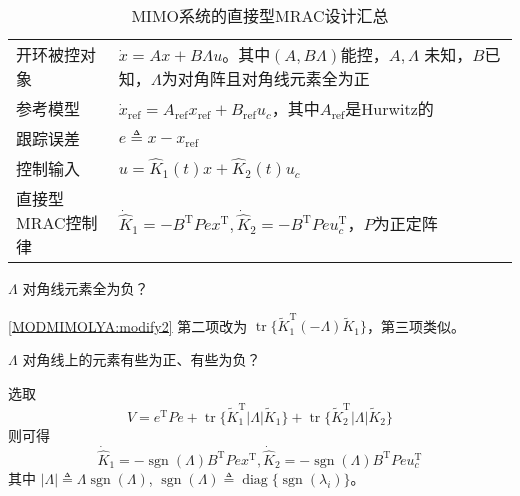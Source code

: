 \begin{table}[htbp]
  \centering
  \setcellgapes{4pt}
  \makegapedcells
  \caption{MIMO系统的直接型MRAC设计汇总}
  \begin{tabular}{p{4.0cm}p{10.0cm}}
    \hline
    开环被控对象 & $\dot{x} = A  x + B \Lambda u$。其中$(A,B\Lambda)$能控，$ A, \Lambda $ 未知，$B$已知，$\Lambda$为对角阵且对角线元素全为正\\
    参考模型 & $\dot{x}_{\ensuremath{\operatorname{ref}}} =
    A_{\ensuremath{\operatorname{ref}}} x_{\ensuremath{\operatorname{ref}}} +
    B_{\ensuremath{\operatorname{ref}}} u_c$，其中$ A_{\ensuremath{\operatorname{ref}}}$是Hurwitz的\\
    跟踪误差 & $e \triangleq x - x_{\ensuremath{\operatorname{ref}}}$\\
    控制输入 & $u = \hat{K}_1 (t) x + \hat{K}_2 (t) u_c$\\
    直接型MRAC控制律& $\dot{\hat{K}} _1 = - B^\mathrm{T}  P  e  x^\mathrm{T}, \dot{\hat{K}} _2 = - B^\mathrm{T}  P  e  u^\mathrm{T}_c$，$P$为正定阵\\
    \hline
  \end{tabular}
\end{table}

\begin{problem}
    $\Lambda$ 对角线元素全为负？
\end{problem}
\begin{hint}
\eqref{MODMIMOLYA:modify2} 第二项改为 $\ensuremath{\operatorname{tr}} \{ \tilde{K}^\mathrm{T}_1 (- \Lambda) \tilde{K} _1 \}$，第三项类似。
\end{hint}
\begin{problem}
    $\Lambda$ 对角线上的元素有些为正、有些为负？
\end{problem}
\begin{hint}
    选取\[ V = e^\mathrm{T} P  e +\ensuremath{\operatorname{tr}} \{ \tilde{K}^\mathrm{T}_1 |
       \Lambda | \tilde{K} _1 \} +\ensuremath{\operatorname{tr}} \{
       \tilde{K}^\mathrm{T}_2 | \Lambda | \tilde{K} _2 \} \]
    则可得
    \[ \dot{\hat{K}} _1 = -\ensuremath{\operatorname{sgn}} (\Lambda) B^\mathrm{T}  P  e
       x^\mathrm{T}, \dot{\hat{K}} _2 = -\ensuremath{\operatorname{sgn}} (\Lambda) B^\mathrm{T}
       P  e  u^\mathrm{T}_c \]
    其中 $| \Lambda | \triangleq \Lambda \ensuremath{\operatorname{sgn}}
    (\Lambda)$, $\ensuremath{\operatorname{sgn}} (\Lambda) \triangleq
    \ensuremath{\operatorname{diag}} \{ \ensuremath{\operatorname{sgn}}
    (\lambda_i) \}$。
\end{hint}

